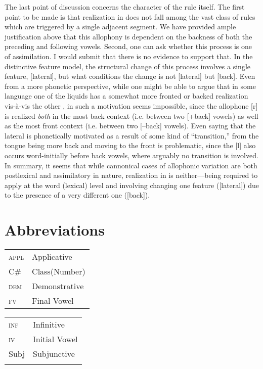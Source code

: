 \documentclass[output=paper,modfonts,nonflat,
colorlinks, citecolor=brown,
draftmode,
]{langsci/langscibook}
\begin{document}
The last point of discussion concerns the character of the rule itself. The first point to be made is that  realization in  does not fall among the vast class of rules which are triggered by a single adjacent segment. We have provided ample justification above that this allophony is dependent on the backness of both the preceding and following vowels. Second, one can ask whether this process is one of assimilation. I would submit that there is no evidence to support that. In the distinctive feature model, the structural change of this process involves a single feature, [lateral], but what conditions the change is not [lateral] but [back]. Even from a more phonetic perspective, while one might be able to argue that in some language one of the liquids has a somewhat more fronted or backed realization vis-à-vis the other , in  such a motivation seems impossible, since the allophone [r] is realized \textit{both} in the most back context (i.e. between two [+back] vowels) as well as the most front context (i.e. between two [--back] vowels). Even saying that the lateral is phonetically motivated as a result of some kind of “transition,” from the tongue being more back and moving to the front is problematic, since the [l] also occurs word-initially before back vowels, where arguably no transition is involved. In summary, it seems that while cannonical cases of allophonic variation are both postlexical and assimilatory in nature,  realization in  is neither—being required to apply at the word (lexical) level and involving changing one feature ([lateral]) due to the presence of a very different one ([back]).

\section*{Abbreviations}

\begin{tabularx}{.45\textwidth}{lQ}
\textsc{appl} & {Applicative}\\
{C\#} & {Class(Number)}\\
{\textsc{dem}} & {Demonstrative}\\
{\textsc{fv}} & {Final Vowel}\\
\end{tabularx}
\begin{tabularx}{.45\textwidth}{lQ}
{\textsc{inf}} & {Infinitive}\\
\textsc{iv} & {Initial Vowel}\\
{Subj} & {Subjunctive}\\
\\
\end{tabularx}
 

\sloppy
\printbibliography[heading=subbibliography,notkeyword=this]
\end{document}
